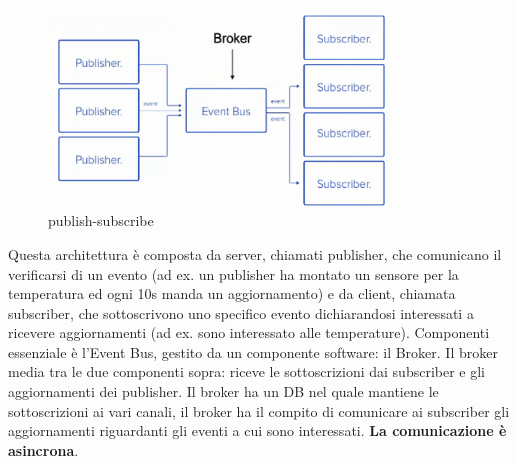 \documentclass[12pt,italian]{report}
\begin{document}
\begin{figure}[h]
\centering
\includegraphics[width=90mm]{img/ppsub.png}
\caption{publish-subscribe}
\label{fig:psub}
\end{figure}
Questa architettura è composta da server, chiamati publisher, che comunicano il verificarsi di un evento (ad ex. un publisher ha montato un sensore per la temperatura ed ogni 10s manda un aggiornamento) e da client, chiamata subscriber, che sottoscrivono uno specifico evento dichiarandosi interessati a ricevere aggiornamenti (ad ex. sono interessato alle temperature). Componenti essenziale è l'Event Bus, gestito da un componente software: il Broker. Il broker media tra le due componenti sopra: riceve le sottoscrizioni dai subscriber e gli aggiornamenti dei publisher. Il broker ha un DB nel quale mantiene le sottoscrizioni ai vari canali, il broker ha il compito di comunicare ai subscriber gli aggiornamenti riguardanti gli eventi a cui sono interessati. \textbf{La comunicazione è asincrona}.
\newpage
\end{document}
